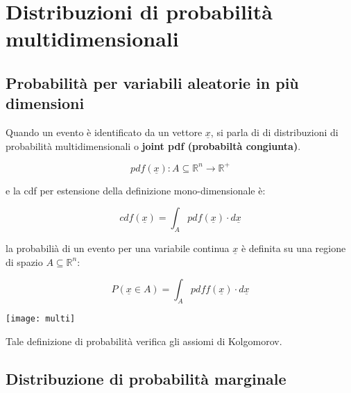 \documentclass[11pt,a4paper]{book}
\begin{document}
	\setcounter{chapter}{2}
  	\chapter{Distribuzioni di probabilit\`{a} multidimensionali}
  	
  	\section{Probabilit\`{a} per variabili aleatorie in pi\`{u} \\ dimensioni}
  	
  	Quando un evento \`{e} identificato da un vettore $\underline{x}$, si parla di di distribuzioni di probabilit\`{a} multidimensionali o \textbf{joint pdf (probabilt\`{a} congiunta)}.  
  	
  	\begin{equation*}
  		pdf(\underline{x}): A \subseteq \mathbb{R}^n \rightarrow \mathbb{R}^+
  	\end{equation*}
  	
  	e la cdf per estensione della definizione mono-dimensionale \`{e}:
  	
	\begin{equation*}
  		cdf(\underline{x}) = \int_{A}pdf(\underline{x}) \cdot d\underline{x}
	\end{equation*}
  	
  	
	la probabili\`{a} di un evento per una variabile continua $\underline{x}$ \`{e} definita su una regione di spazio $A \subseteq \mathbb{R}^n$:
  	
	\vspace{0.2in}
  \begin{minipage}{0.5\textwidth}
		\begin{equation*}
  			P(\underline{x} \in A) = \int_{A}pdff(\underline{x}) \cdot d\underline{x}
  		\end{equation*}
  \end{minipage}
  \begin{minipage}{.4\textwidth}
    \centering
    \texttt{[image: multi]}

  \end{minipage}
	\vspace{0.2in}

Tale definizione di probabilit\`{a} verifica gli assiomi di Kolgomorov.
	
\section{Distribuzione di probabilit\`{a} marginale}
\end{document}
